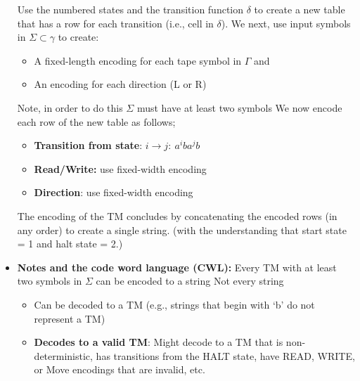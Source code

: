\documentclass{report}
\begin{document}
\begin{itemize}
\begin{itemize}
            \end{itemize}
            \bigbreak \noindent 
            Use the numbered states and the transition function $\delta$ to create a new table that has a row for each transition (i.e., cell in $\delta$).
            \bigbreak \noindent 
            \bigbreak \noindent 
            We next, use input symbols in $\Sigma \subset \gamma $ to create:
            \bigbreak \noindent 
            \begin{itemize}
                \item A fixed-length encoding for each tape symbol in $\Gamma$ and
                \item An encoding for each direction (L or R)
            \end{itemize}
            \bigbreak \noindent 
            Note, in order to do this $\Sigma$ must have at least two symbols
            \bigbreak \noindent 
            \bigbreak \noindent 
            We now encode each row of the new table as follows;
            \begin{itemize}
                \item \textbf{Transition from state}: $i \to j:\ a^{i}ba^{j}b$
                \item \textbf{Read/Write:} use fixed-width encoding
                \item \textbf{Direction}: use fixed-width encoding
            \end{itemize}
            \bigbreak \noindent 
            \bigbreak \noindent 
            The encoding of the TM concludes by concatenating the encoded rows (in any order) to create a single string. (with the understanding that start state = 1 and halt state = 2.)
        \item \textbf{Notes and the code word language (CWL):} Every TM with at least two symbols in $\Sigma$ can be encoded to a string
            \bigbreak \noindent 
            Not every string
            \begin{itemize}
                \item Can be decoded to a TM (e.g., strings that begin with ‘b’ do not represent a TM)
                \item \textbf{Decodes to a valid TM}: Might decode to a TM that is non-deterministic, has transitions from the HALT state, have READ, WRITE, or Move encodings that are invalid, etc.


\end{itemize}
\end{itemize}
\end{document}
